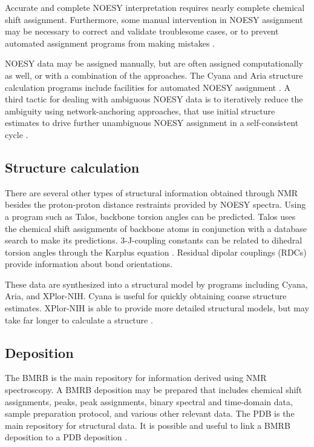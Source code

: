 Accurate and complete NOESY interpretation requires nearly complete chemical
shift assignment.  Furthermore, some manual intervention in NOESY assignment
may be necessary to correct and validate troublesome cases, or to prevent
automated assignment programs from making mistakes 
\cite{guntert2009automated, guerry2011automated}.

NOESY data may be assigned manually, but are often assigned computationally
as well, or with a combination of the approaches.  The Cyana and Aria structure 
calculation programs include facilities for automated NOESY assignment
\cite{cyana2004, aria2003}.  
A third tactic for dealing with ambiguous NOESY data is to iteratively reduce the
ambiguity using network-anchoring approaches, that use initial structure 
estimates to drive further unambiguous NOESY assignment in a self-consistent
cycle \cite{cyana2004, aria2003}.

\subsection*{Structure calculation}

There are several other types of structural information obtained through NMR
besides the proton-proton distance restraints provided by NOESY spectra.
Using a program such as Talos, backbone torsion angles can be predicted.  Talos
uses the chemical shift assignments of backbone atoms in conjunction with a
database search to make its predictions.  3-J-coupling constants can be 
related to dihedral torsion angles through the Karplus equation
\cite{karplus1959contact, karplus1963vicinal}.  Residual dipolar couplings
(RDCs) provide information about bond orientations.

These data are synthesized into a structural model by programs including Cyana,
Aria, and XPlor-NIH.  Cyana is useful for quickly obtaining coarse structure
estimates.  XPlor-NIH is able to provide more detailed structural models, but
may take far longer to calculate a structure \cite{xplor-nih, cyana2004}.

\subsection*{Deposition}

The BMRB is the main repository for information derived using NMR spectroscopy.
A BMRB deposition may be prepared that includes chemical shift assignments,
peaks, peak assignments, binary spectral and time-domain data, sample 
preparation protocol, and various other relevant data.  The PDB is the main 
repository for structural data.  It is possible and useful to link a BMRB
deposition to a PDB deposition \cite{bmrb, pdb}.




